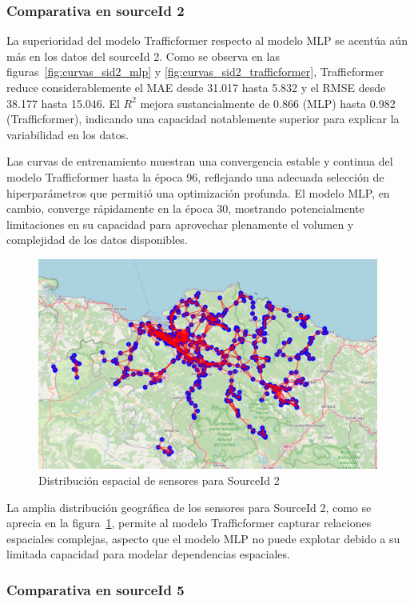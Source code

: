 \subsubsection{Comparativa en sourceId 2}

La superioridad del modelo Trafficformer respecto al modelo MLP se acentúa aún más en los datos del sourceId 2. Como se observa en las figuras~\ref{fig:curvas_sid2_mlp} y \ref{fig:curvas_sid2_trafficformer}, Trafficformer reduce considerablemente el MAE desde 31.017 hasta 5.832 y el RMSE desde 38.177 hasta 15.046. El $R^2$ mejora sustancialmente de 0.866 (MLP) hasta 0.982 (Trafficformer), indicando una capacidad notablemente superior para explicar la variabilidad en los datos.

Las curvas de entrenamiento muestran una convergencia estable y continua del modelo Trafficformer hasta la época 96, reflejando una adecuada selección de hiperparámetros que permitió una optimización profunda. El modelo MLP, en cambio, converge rápidamente en la época 30, mostrando potencialmente limitaciones en su capacidad para aprovechar plenamente el volumen y complejidad de los datos disponibles.

\begin{figure}[H]
	\centering
	\includegraphics[width=0.7\linewidth]{includes/cap5/source_id_2_meters_mask.png}
	\caption{Distribución espacial de sensores para SourceId 2}
	\label{fig:sensores_sid2}
\end{figure}

La amplia distribución geográfica de los sensores para SourceId 2, como se aprecia en la figura~\ref{fig:sensores_sid2}, permite al modelo Trafficformer capturar relaciones espaciales complejas, aspecto que el modelo MLP no puede explotar debido a su limitada capacidad para modelar dependencias espaciales.

\subsubsection{Comparativa en sourceId 5}

